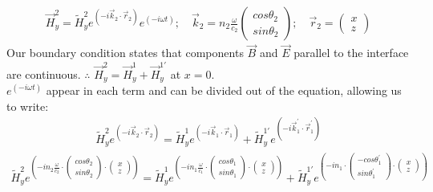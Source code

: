 \documentclass{article}
\begin{document}
\begin{align}
\vec{H}_{y}^{2} = \tilde{H}_{y}^{2} e^{\left( -i \vec{k}_{2} \cdot \vec{r}_{2} \right)} e^ {\left(-i \omega t \right)}; \quad 
\vec{k}_{2} = n_{2} \frac{\omega}{c_{2}} 
\begin{pmatrix}
	cos{\theta_{2}} \\
	sin{\theta_{2}}
\end{pmatrix}; \quad
\vec{r}_{2} = 
\begin{pmatrix}
	x \\
	z
\end{pmatrix}
\end{align}
Our boundary condition states that components $\vec{B}$ and $\vec{E}$ parallel to the interface are continuous. $\therefore$ $\vec{H}_{y}^{2} = \vec{H}_{y}^{1} + \vec{H}_{y}^{1'}$ at $x = 0$. \\

$e^ {\left(-i \omega t \right)}$ appear in each term and can be divided out of the equation, allowing us to write:
\begin{align}
\tilde{H}_{y}^{2} e^{\left( -i \vec{k}_{2} \cdot \vec{r}_{2} \right)} = \tilde{H}_{y}^{1} e^{\left( -i \vec{k}_{1} \cdot \vec{r}_{1} \right)} + \tilde{H}_{y}^{1'} e^{\left( -i \vec{k}_{1}^{'} \cdot \vec{r}_{1}^{'} \right)}
\end{align}
\begin{align}
\tilde{H}_{y}^{2} e^{\left( -i n_{2} \frac{\omega}{c_2} \cdot \begin{pmatrix}
	cos{\theta_{2}} \\
	sin{\theta_{2}}
\end{pmatrix} \cdot \begin{pmatrix}
	x \\
	z
\end{pmatrix}
\right)} = \tilde{H}_{y}^{1} e^{\left( -i n_{1} \frac{\omega}{c_1} \cdot \begin{pmatrix}
	cos{\theta_{1}} \\
	sin{\theta_{1}} 
\end{pmatrix} \cdot \begin{pmatrix}
	x \\
	z
\end{pmatrix}\right)} + \tilde{H}_{y}^{1'} e^{\left( -i n_{1} \cdot \begin{pmatrix}
	-cos{\theta_{1}^{'}} \\
	sin{\theta_{1}^{'}} 
\end{pmatrix} \cdot \begin{pmatrix}
	x \\
	z
\end{pmatrix}
\right)}
\end{align}
\end{document}
